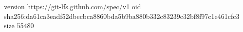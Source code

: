 version https://git-lfs.github.com/spec/v1
oid sha256:da61ca3eadf52dbecbca8860bda5b9ba880b332c83239c32bf8f97c1e461cfc3
size 55480
